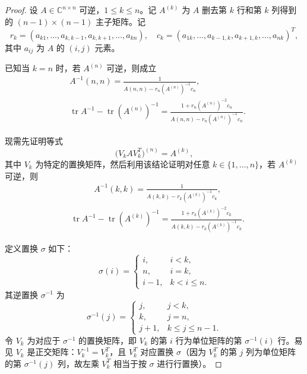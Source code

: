 \begin{proof}
    设 $A \in \mathbb{C}^{n \times n}$ 可逆，$1 \le k \le n$。记 $A^{(k)}$ 为 $A$ 删去第 $k$ 行和第 $k$ 列得到的 $(n-1)\times (n-1)$ 主子矩阵。记
\[
r_k = (a_{k1},\dots,a_{k,k-1},a_{k,k+1},\dots,a_{kn}), \quad 
c_k = (a_{1k},\dots,a_{k-1,k},a_{k+1,k},\dots,a_{nk})^{\!T},
\]
其中 $a_{ij}$ 为 $A$ 的 $(i,j)$ 元素。

已知当 $k=n$ 时，若 $A^{(n)}$ 可逆，则成立
\begin{align}
& A^{-1}(n,n)=\frac{1}{A(n,n)-r_n (A^{(n)})^{-1}c_n}, \label{eq:n_case_i} \\
& \operatorname{tr}A^{-1}-\operatorname{tr}(A^{(n)})^{-1}= \frac{1+r_n (A^{(n)})^{-2}c_n}{A(n,n)-r_n (A^{(n)})^{-1}c_n}. 
\end{align}

现需先证明等式
\[
\bigl(V_k A V_k^{\!T}\bigr)^{(n)} = A^{(k)},
\]
其中 $V_k$ 为特定的置换矩阵，然后利用该结论证明对任意 $k\in\{1,\dots,n\}$，若 $A^{(k)}$ 可逆，则
\begin{align}
& A^{-1}(k,k)=\frac{1}{A(k,k)-r_k (A^{(k)})^{-1}c_k}, \label{eq:k_case_i} \tag{1}
\end{align}
\begin{align}
& \operatorname{tr}A^{-1}-\operatorname{tr}(A^{(k)})^{-1}= \frac{1+r_k (A^{(k)})^{-2}c_k}{A(k,k)-r_k (A^{(k)})^{-1}c_k}. \tag{2}
\end{align}

定义置换 $\sigma$ 如下：
\[
\sigma(i)=
\begin{cases}
i, & i<k, \\
n, & i=k, \\
i-1, & k<i\le n .
\end{cases}
\]
其逆置换 $\sigma^{-1}$ 为
\[
\sigma^{-1}(j)=
\begin{cases}
j, & j<k, \\
k, & j=n, \\
j+1, & k\le j\le n-1 .
\end{cases}
\]
令 $V_k$ 为对应于 $\sigma^{-1}$ 的置换矩阵，即 $V_k$ 的第 $i$ 行为单位矩阵的第 $\sigma^{-1}(i)$ 行。易见 $V_k$ 是正交矩阵：$V_k^{-1}=V_k^{\!T}$，且 $V_k^{\!T}$ 对应置换 $\sigma$（因为 $V_k^{\!T}$ 的第 $j$ 列为单位矩阵的第 $\sigma^{-1}(j)$ 列，故左乘 $V_k^{\!T}$ 相当于按 $\sigma$ 进行行置换）。


\end{proof}
